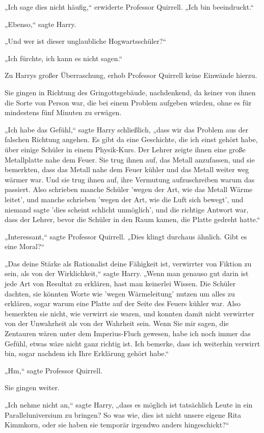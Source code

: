 {„Ich sage dies nicht häufig,“ erwiderte Professor Quirrell. „Ich bin beeindruckt.“

„Ebenso,“ sagte Harry.

„Und wer ist dieser unglaubliche Hogwartsschüler?“

„Ich fürchte, ich kann es nicht sagen.“

Zu Harrys großer Überraschung, erhob Professor Quirrell keine Einwände hierzu.

Sie gingen in Richtung des Gringottsgebäude, nachdenkend, da keiner von ihnen die Sorte von Person war, die bei einem Problem aufgeben würden, ohne es für mindestens fünf Minuten zu erwägen.

„Ich habe das Gefühl,“ sagte Harry schließlich, „dass wir das Problem aus der falschen Richtung angehen. Es gibt da eine Geschichte, die ich einst gehört habe, über einige Schüler in einem Physik-Kurs. Der Lehrer zeigte ihnen eine große Metallplatte nahe dem Feuer. Sie trug ihnen auf, das Metall anzufassen, und sie bemerkten, dass das Metall nahe dem Feuer kühler und das Metall weiter weg wärmer war. Und sie trug ihnen auf, ihre Vermutung aufzuschreiben warum das passiert. Also schrieben manche Schüler 'wegen der Art, wie das Metall Wärme leitet', und manche schrieben 'wegen der Art, wie die Luft sich bewegt', und niemand sagte 'dies scheint schlicht unmöglich', und die richtige Antwort war, dass der Lehrer, bevor die Schüler in den Raum kamen, die Platte gedreht hatte.“

„Interessant,“ sagte Professor Quirrell. „Dies klingt durchaus ähnlich. Gibt es eine Moral?“

„Das deine Stärke als Rationalist deine Fähigkeit ist, verwirrter von Fiktion zu sein, als von der Wirklichkeit,“ sagte Harry. „Wenn man genauso gut darin ist jede Art von Resultat zu erklären, hast man keinerlei Wissen. Die Schüler dachten, sie könnten Worte wie 'wegen Wärmeleitung' nutzen um alles zu erklären, sogar warum eine Platte auf der Seite des Feuers kühler war. Also bemerkten sie nicht, wie verwirrt sie waren, und konnten damit nicht verwirrter von der Unwahrheit als von der Wahrheit sein. Wenn Sie mir sagen, die Zentauren wären unter dem Imperius-Fluch gewesen, habe ich noch immer das Gefühl, etwas wäre nicht ganz richtig ist. Ich bemerke, dass ich weiterhin verwirrt bin, sogar nachdem ich Ihre Erklärung gehört habe.“

„Hm,“ sagte Professor Quirrell.

Sie gingen weiter.

„Ich nehme nicht an,“ sagte Harry, „dass es möglich ist tatsächlich Leute in ein Paralleluniversium zu bringen? So was wie, dies ist nicht unsere eigene Rita Kimmkorn, oder sie haben sie temporär irgendwo anders hingeschickt?“

}

